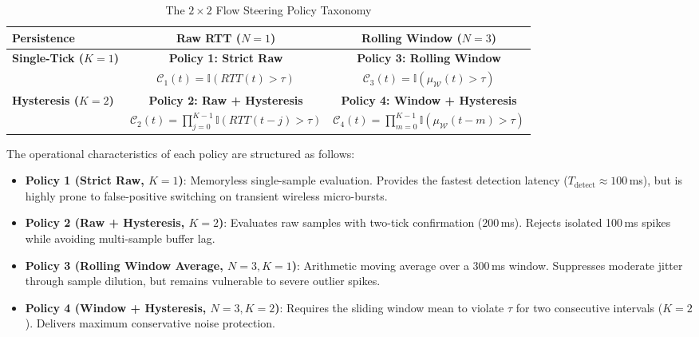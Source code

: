 \begin{table}[htbp]
\caption{The $2 \times 2$ Flow Steering Policy Taxonomy}
\label{tab:policy_taxonomy_phase2}
\centering
\begin{tabular}{lcc}
\toprule
\textbf{Persistence} & \textbf{Raw RTT ($N=1$)} & \textbf{Rolling Window ($N=3$)} \\
\midrule
\textbf{Single-Tick ($K=1$)} & \textbf{Policy 1: Strict Raw} & \textbf{Policy 3: Rolling Window} \\
& $\mathcal{C}_1(t) = \mathbb{I}(RTT(t) > \tau)$ & $\mathcal{C}_3(t) = \mathbb{I}(\mu_{\mathcal{W}}(t) > \tau)$ \\[4pt]
\textbf{Hysteresis ($K=2$)} & \textbf{Policy 2: Raw + Hysteresis} & \textbf{Policy 4: Window + Hysteresis} \\
& $\mathcal{C}_2(t) = \prod_{j=0}^{K-1} \mathbb{I}(RTT(t-j) > \tau)$ & $\mathcal{C}_4(t) = \prod_{m=0}^{K-1} \mathbb{I}(\mu_{\mathcal{W}}(t-m) > \tau)$ \\
\bottomrule
\end{tabular}
\end{table}

The operational characteristics of each policy are structured as follows:
\begin{itemize}
    \item \textbf{Policy 1 (Strict Raw, $K=1$)}: Memoryless single-sample evaluation. Provides the fastest detection latency ($T_{\text{detect}} \approx 100$\,ms), but is highly prone to false-positive switching on transient wireless micro-bursts.
    \item \textbf{Policy 2 (Raw + Hysteresis, $K=2$)}: Evaluates raw samples with two-tick confirmation ($200$\,ms). Rejects isolated 100\,ms spikes while avoiding multi-sample buffer lag.
    \item \textbf{Policy 3 (Rolling Window Average, $N=3, K=1$)}: Arithmetic moving average over a 300\,ms window. Suppresses moderate jitter through sample dilution, but remains vulnerable to severe outlier spikes.
    \item \textbf{Policy 4 (Window + Hysteresis, $N=3, K=2$)}: Requires the sliding window mean to violate $\tau$ for two consecutive intervals ($K=2$). Delivers maximum conservative noise protection.
\end{itemize}

